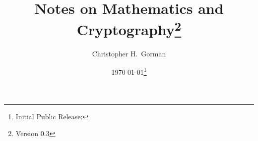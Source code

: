 
\newcommand*{\Author}[0]{Christopher H.~Gorman}
\newcommand*{\Title}[0]{Notes on Mathematics and Cryptography}






\author{\Author{}}
\title{\Title{}\thanks{Version 0.3}}
\date{\today\thanks{Initial Public Release: }}


